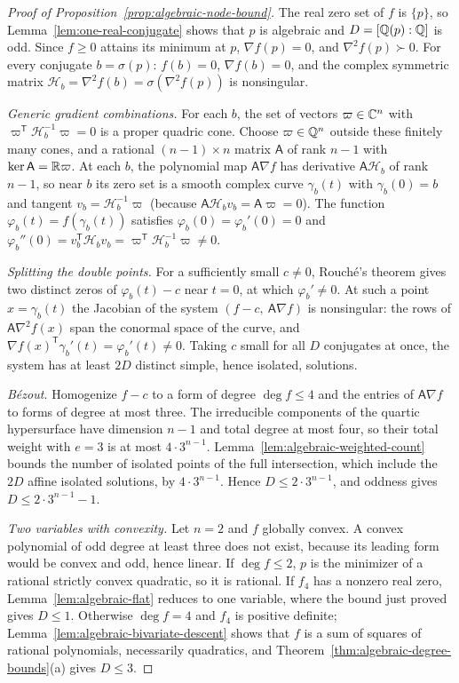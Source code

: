 \begin{proof}[Proof of Proposition~\ref{prop:algebraic-node-bound}]
The real zero set of $f$ is $\{p\}$, so Lemma~\ref{lem:one-real-conjugate}
shows that $p$ is algebraic and $D=[\mathbb Q(p):\mathbb Q]$ is odd. Since $f\ge0$ attains
its minimum at $p$, $\nabla f(p)=0$, and $\nabla^2f(p)\succ0$. For every
conjugate $b=\sigma(p)$: $f(b)=0$, $\nabla f(b)=0$, and the complex symmetric
matrix $\mathcal H_b=\nabla^2f(b)=\sigma(\nabla^2f(p))$ is nonsingular.

\emph{Generic gradient combinations.} For each $b$, the set of vectors
$\varpi\in\mathbb C^n$ with $\varpi^{\mathsf T}\mathcal H_b^{-1}\varpi=0$ is a proper
quadric cone. Choose $\varpi\in\mathbb Q^n$ outside these finitely many cones, and a
rational $(n-1)\times n$ matrix $\mathsf A$ of rank $n-1$ with
$\ker\mathsf A=\mathbb R\varpi$. At each $b$, the polynomial map $\mathsf A\nabla f$
has derivative $\mathsf A\mathcal H_b$ of rank $n-1$, so near $b$ its zero set
is a smooth complex curve $\gamma_b(t)$ with $\gamma_b(0)=b$ and tangent
$v_b=\mathcal H_b^{-1}\varpi$ (because $\mathsf A\mathcal H_bv_b=\mathsf
A\varpi=0$). The function $\varphi_b(t)=f(\gamma_b(t))$ satisfies
$\varphi_b(0)=\varphi_b'(0)=0$ and
$\varphi_b''(0)=v_b^{\mathsf T}\mathcal H_bv_b=\varpi^{\mathsf T}\mathcal
H_b^{-1}\varpi\ne0$.

\emph{Splitting the double points.} For a sufficiently small $c\ne0$, Rouch\'e's
theorem gives two distinct zeros of $\varphi_b(t)-c$ near $t=0$, at which
$\varphi_b'\ne0$. At such a point $x=\gamma_b(t)$ the Jacobian of the system
$(f-c,\ \mathsf A\nabla f)$ is nonsingular: the rows of $\mathsf A\nabla^2f(x)$
span the conormal space of the curve, and $\nabla f(x)^{\mathsf
T}\gamma_b'(t)=\varphi_b'(t)\ne0$. Taking $c$ small for all $D$ conjugates at
once, the system has at least $2D$ distinct simple, hence isolated,
solutions.

\emph{B\'ezout.} Homogenize $f-c$ to a form of degree $\deg f\le4$ and the
entries of $\mathsf A\nabla f$ to forms of degree at most three. The
irreducible components of the quartic hypersurface have dimension $n-1$ and
total degree at most four, so their total weight with $e=3$ is at most
$4\cdot3^{n-1}$. Lemma~\ref{lem:algebraic-weighted-count} bounds the number of
isolated points of the full intersection, which include the $2D$ affine
isolated solutions, by $4\cdot3^{n-1}$. Hence $D\le2\cdot3^{n-1}$, and
oddness gives $D\le2\cdot3^{n-1}-1$.

\emph{Two variables with convexity.} Let $n=2$ and $f$ globally convex. A
convex polynomial of odd degree at least three does not exist, because its
leading form would be convex and odd, hence linear. If $\deg f\le2$, $p$ is
the minimizer of a rational strictly convex quadratic, so it is rational. If $f_4$ has a nonzero real zero, Lemma~\ref{lem:algebraic-flat}
reduces to one variable, where the bound just proved gives $D\le1$. Otherwise
$\deg f=4$ and $f_4$ is positive definite; Lemma~\ref{lem:algebraic-bivariate-descent}
shows that $f$ is a sum of squares of rational polynomials, necessarily
quadratics, and Theorem~\ref{thm:algebraic-degree-bounds}(a) gives $D\le3$.
\end{proof}


